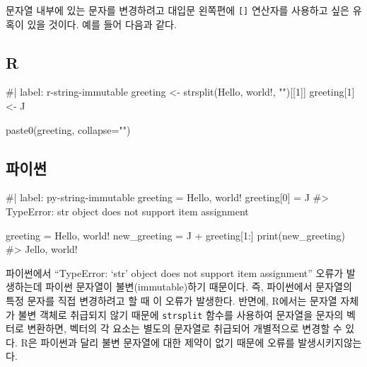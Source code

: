\documentclass[
  letterpaper,
]{book}
\newenvironment{Shaded}{\begin{snugshade}}{\end{snugshade}}
\newcommand{\NormalTok}[1]{\textcolor[rgb]{0.00,0.23,0.31}{#1}}
\begin{document}
  

문자열 내부에 있는 문자를 변경하려고 대입문 왼쪽편에 \texttt{{[}{]}}
연산자를 사용하고 싶은 유혹이 있을 것이다. 예를 들어 다음과 같다.
 

\subsection{R}

\begin{Shaded}
\begin{Highlighting}[]
\NormalTok{\#| label: r{-}string{-}immutable}
\NormalTok{greeting \textless{}{-} strsplit(\textquotesingle{}Hello, world!\textquotesingle{}, "")[[1]]}
\NormalTok{greeting[1] \textless{}{-} \textquotesingle{}J\textquotesingle{}}

\NormalTok{paste0(greeting, collapse="")}
\end{Highlighting}
\end{Shaded}

\subsection{파이썬}

\begin{Shaded}
\begin{Highlighting}[]
\NormalTok{\#| label: py{-}string{-}immutable}
\NormalTok{greeting = \textquotesingle{}Hello, world!\textquotesingle{}}
\NormalTok{greeting[0] = \textquotesingle{}J\textquotesingle{}}
\NormalTok{\#\textgreater{} TypeError: \textquotesingle{}str\textquotesingle{} object does not support item assignment}

\NormalTok{greeting = \textquotesingle{}Hello, world!\textquotesingle{}}
\NormalTok{new\_greeting = \textquotesingle{}J\textquotesingle{} + greeting[1:]}
\NormalTok{print(new\_greeting)}
\NormalTok{\#\textgreater{} Jello, world!}
\end{Highlighting}
\end{Shaded}

파이썬에서 ``TypeError: `str' object does not support item assignment''
오류가 발생하는데 파이썬 문자열이 불변(immutable)하기 때문이다. 즉,
파이썬에서 문자열의 특정 문자를 직접 변경하려고 할 때 이 오류가
발생한다. 반면에, R에서는 문자열 자체가 불변 객체로 취급되지 않기 때문에
\texttt{strsplit} 함수를 사용하여 문자열을 문자의 벡터로 변환하면,
벡터의 각 요소는 별도의 문자열로 취급되어 개별적으로 변경할 수 있다. R은
파이썬과 달리 불변 문자열에 대한 제약이 없기 때문에 오류를
발생시키지않는다.
\end{document}

